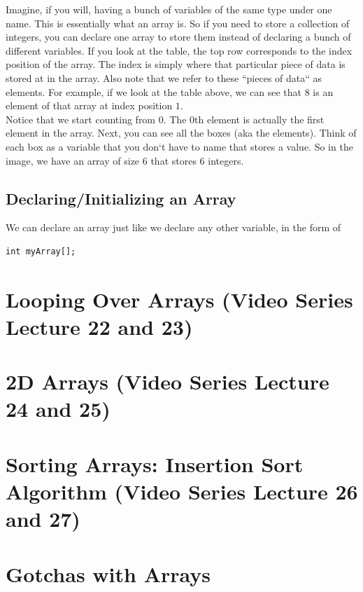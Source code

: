 \documentclass[11]{article}
\begin{document}
Imagine, if you will, having a bunch of variables of the same type under one name. This is essentially what an array is. So if you need to store a collection of integers, you can declare one array to store them instead of declaring a bunch of different variables. If you look at the table, the top row corresponds to the index position of the array. The index is simply where that particular piece of data is stored at in the array. Also note that we refer to these ``pieces of data`` as elements. For example, if we look at the table above, we can see that $8$ is an element of that array at index position $1$. \\

Notice that we start counting from $0$. The $0$th element is actually the first element in the array. Next, you can see all the boxes (aka the elements). Think of each box as a variable that you don`t have to name that stores a value. So in the image, we have an array of size $6$ that stores $6$ integers.\\

\subsection{Declaring/Initializing an Array}
We can declare an array just like we declare any other variable, in the form of
\begin{lstlisting}
int myArray[];
\end{lstlisting}

\section{Looping Over Arrays (Video Series Lecture 22 and 23)}
\section{2D Arrays (Video Series Lecture 24 and 25)}
\section{Sorting Arrays: Insertion Sort Algorithm (Video Series Lecture 26 and 27)}
\section{Gotchas with Arrays}
\end{document}
